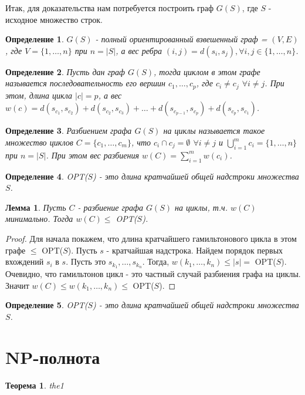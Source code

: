 \documentclass[a4paper,10pt]{article}
\newtheorem{theorem}{Теорема}
\newtheorem{lemma}{Лемма}
\newtheorem{definition}{Определение}
\begin{document}
Итак, для доказательства нам потребуется построить граф $G(S)$, где $S$ - исходное множество строк. 

\begin{definition}
$G(S)$ - полный ориентированный взвешенный граф = $(V, E)$, где $V = \{ 1, \dots, n \}$ при $n = |S|$, а вес ребра $(i, j) = d(s_i, s_j), \forall i,j \in \{ 1, \dots, n \}$.
\end{definition}

\begin{definition}
Пусть дан граф $G(S)$, тогда циклом в этом графе называется последовательность его вершин $c_1, \dots, c_p$, где $c_i \ne c_j$ $\forall i \ne j$.
При этом, длина цикла $|c| = p$, а вес $w(c) = d(s_{c_1}, s_{c_2}) + d(s_{c_2}, s_{c_3}) + \dots + d(s_{c_{p-1}}, s_{c_p}) + d(s_{c_p}, s_{c_1})$.
\end{definition}

\begin{definition}
Разбиением графа $G(S)$ на циклы называется такое множество циклов $C = \{ c_1, \dots, c_m \}$, 
что $c_i \cap c_j = \emptyset$ $\forall i \ne j$ и $\bigcup\limits_{i=1}^m c_i = \{ 1, \dots, n \}$ при $n = |S|$.
При этом вес разбиения $w(C) = \sum\limits_{i=1}^m w(c_i)$.
\end{definition}

\begin{definition}
OPT($S$) - это длина кратчайшей общей надстроки множества $S$.
\end{definition}

\begin{lemma}
Пусть $C$ - разбиение графа $G(S)$ на циклы, т.ч. $w(C)$ минимально.
Тогда $w(C) \leq$ OPT($S$).
\end{lemma}

\begin{proof}
Для начала покажем, что длина кратчайшего гамильтонового цикла в этом графе $\leq$ OPT($S$).
Пусть $s$ - кратчайшая надстрока. Найдем порядок первых вхождений $s_i$ в $s$. Пусть это $s_{k_1}, \dots, s_{k_n}$.
Тогда, $w(k_1, \dots, k_n) \leq |s| =$ OPT($S$). Очевидно, что гамильтонов цикл - это частный случай разбиения графа на циклы.
Значит $w(C) \leq w(k_1, \dots, k_n) \leq$ OPT($S$).
\end{proof}

\begin{definition}
OPT($S$) - это длина кратчайшей общей надстроки множества $S$.
\end{definition}

\section{NP-полнота}

\begin{theorem}
the1
\end{theorem}
\end{document}
